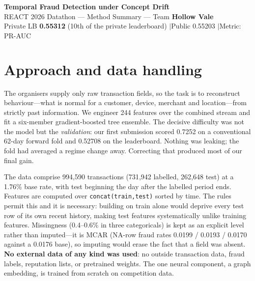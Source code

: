 \documentclass[10pt,a4paper]{article}
\begin{document}
\begin{center}
{\large\bfseries Temporal Fraud Detection under Concept Drift}\\[2pt]
{REACT 2026 Datathon --- Method Summary --- Team \textbf{Hollow Vale}}\\[2pt]
{\small Private LB \textbf{0.55312} (10th of the private leaderboard) \quad$\vert$\quad Public 0.55203 \quad$\vert$\quad Metric: PR-AUC}
\end{center}

\vspace{-6pt}

\section{Approach and data handling}

The organisers supply only raw transaction fields, so the task is to reconstruct
behaviour---what is normal for a customer, device, merchant and location---from
strictly past information. We engineer 244 features over the combined stream and
fit a six-member gradient-boosted tree ensemble. The decisive difficulty was not
the model but the \emph{validation}: our first submission scored 0.7252 on a
conventional 62-day forward fold and 0.52708 on the leaderboard. Nothing was
leaking; the fold had averaged a regime change away. Correcting that produced
most of our final gain.

The data comprise 994{,}590 transactions (731{,}942 labelled, 262{,}648 test) at
a 1.76\% base rate, with test beginning the day after the labelled period ends.
Features are computed over \texttt{concat(train,test)} sorted by time. The rules
permit this and it is necessary: building on train alone would deprive every test
row of its own recent history, making test features systematically unlike
training features. Missingness (0.4--0.6\% in three categoricals) is kept as an
explicit level rather than imputed---it is MCAR (NA-row fraud rates 0.0199 /
0.0193 / 0.0170 against a 0.0176 base), so imputing would erase the fact that a
field was absent. \textbf{No external data of any kind was used}: no outside
transaction data, fraud labels, reputation lists, or pretrained weights. The one
neural component, a graph embedding, is trained from scratch on competition data.
\end{document}
